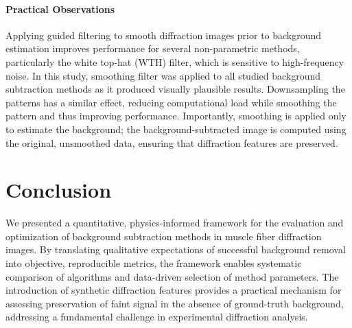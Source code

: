 \documentclass[iucr]{iucrjournals}
\begin{document}
\paragraph{Practical Observations}
Applying guided filtering to smooth diffraction images prior to background estimation improves performance for several non-parametric methods, particularly the white top-hat (WTH) filter, which is sensitive to high-frequency noise. In this study, smoothing filter was applied to all studied background subtraction methods as it produced visually plausible results. Downsampling the patterns has a similar effect, reducing computational load while smoothing the pattern and thus improving performance. Importantly, smoothing is applied only to estimate the background; the background-subtracted image is computed using the original, unsmoothed data, ensuring that diffraction features are preserved.





\section{Conclusion} 

We presented a quantitative, physics-informed framework for the evaluation and optimization of background subtraction methods in muscle fiber diffraction images. By translating qualitative expectations of successful background removal into objective, reproducible metrics, the framework enables systematic comparison of algorithms and data-driven selection of method parameters. The introduction of synthetic diffraction features provides a practical mechanism for assessing preservation of faint signal in the absence of ground-truth background, addressing a fundamental challenge in experimental diffraction analysis.
\end{document}

